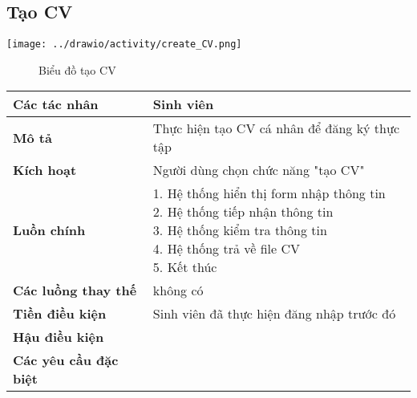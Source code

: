 \subsection{Tạo CV}
\begin{center}
	\texttt{[image: ../drawio/activity/create\_CV.png]}
	\begin{figure}[h]
		\centering
		\caption{Biểu đồ tạo CV}
	\end{figure}
\end{center}
\begin{tabular}{|l|l|}
	\hline
	\textbf{Các tác nhân}         & Sinh viên                                             \\
	\hline
	\textbf{Mô tả}                & Thực hiện tạo CV cá nhân để đăng ký thực tập          \\
	\hline
	\textbf{Kích hoạt}            & Người dùng chọn chức năng "tạo CV"                    \\
	\hline
	\textbf{Luồn chính}           & \makecell[l]{1. Hệ thống hiển thị form nhập thông tin \\ 2. Hệ thống tiếp nhận thông tin \\ 3. Hệ thống kiểm tra thông tin \\ 4. Hệ thống trả về file CV \\ 5. Kết thúc} \\
	\hline
	\textbf{Các luồng thay thế}   & không có                                              \\
	\hline
	\textbf{Tiền điều kiện}       & Sinh viên đã thực hiện đăng nhập trước đó             \\
	\hline
	\textbf{Hậu điều kiện}        &                                                       \\
	\hline
	\textbf{Các yêu cầu đặc biệt} &                                                       \\
	\hline
\end{tabular}

